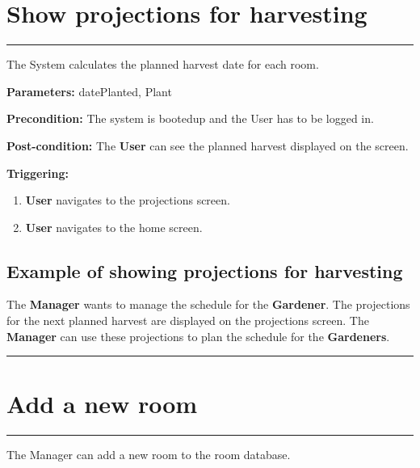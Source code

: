 \section{Show projections for harvesting}
\hrule
\hfill
\vspace{0.5cm}
\label{operation:Show projections for harvesting}

The System calculates the planned harvest date for each room.

\begin{description}

\item \textbf{Parameters:} datePlanted, Plant
\item \textbf{Precondition:} The system is bootedup and the User has to be
logged in.
\item \textbf{Post-condition:} The \textbf{User} can see the planned harvest displayed on the screen.
\item \textbf{Triggering:}
\begin{enumerate}

\item \textbf{User} navigates to the projections screen.
\item \textbf{User} navigates to the home screen.

\end{enumerate}
\end{description}

\subsection{Example of showing projections for harvesting}
The \textbf{Manager} wants to manage the schedule for the \textbf{Gardener}. The projections for the next planned harvest are displayed on the projections screen. 
The \textbf{Manager} can use these projections to plan the schedule for the \textbf{Gardeners}.
\hfill
\vspace{0.5cm}
\hrule




\section{Add a new room}
\hrule
\hfill
\vspace{0.5cm}
\label{operation:Add a new room}

The Manager can add a new room to the room database.

